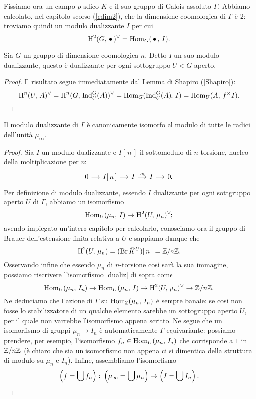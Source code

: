 Fissiamo ora un campo $ p $-adico $ K $ e il suo gruppo di Galois assoluto $ \Gamma $. Abbiamo calcolato, nel capitolo scorso (\ref{cdim2}), che la dimensione coomologica di $ \Gamma $ è 2: troviamo quindi un modulo dualizzante $ I $ per cui 
\[ \operatorname{H}^2(G, \, \bullet \, )^\vee = \operatorname{Hom}_G(\,\bullet\, , \, I). \]




\begin{lemma}
	Sia $ G $ un gruppo di dimensione coomologica $ n $. Detto $ I $ un suo modulo dualizzante, questo è dualizzante per ogni sottogruppo $ U < G $ aperto.
\end{lemma}
\begin{proof}
	Il risultato segue immediatamente dal Lemma di Shapiro (\ref{Shapiro}):
	\[ \operatorname{H}^n(U, \, A)^\vee = \operatorname{H}^n(G, \, \operatorname{Ind}_U^G(A))^\vee = \operatorname{Hom}_G(\operatorname{Ind}_U^G(A), \, I) = \operatorname{Hom}_U(A, \, f^\times I). \qedhere \]
\end{proof}


\begin{proposition}
	Il modulo dualizzante di $ \Gamma $ è canonicamente isomorfo al modulo di tutte le radici dell'unità $ \mu_\infty $.
\end{proposition}
\begin{proof}
	Sia $ I $ un modulo dualizzante e $ I[\, n\, ] $ il sottomodulo di $ n $-torsione, nucleo della moltiplicazione per $ n $:
	\[ \begin{tikzcd}[column sep = small]
	0 \rar & I[\, n \,] \rar & I \rar["\cdot n"] & I \rar & 0.
	\end{tikzcd} \]
	Per definizione di modulo dualizzante, essendo $ I $ dualizzante per ogni sottgruppo aperto $ U $ di $ \Gamma $, abbiamo un isomorfismo
	\begin{equation}\label{dualiz}
	\operatorname{Hom}_U(\mu_n, \, I) \to \operatorname{H}^2(U, \, \mu_n)^\vee;
	\end{equation}
	avendo impiegato un'intero capitolo per calcolarlo, conosciamo ora il gruppo di Brauer dell'estensione finita relativa a $ U $ e sappiamo dunque che $$  \operatorname{H}^2(U, \, \mu_n) = (\operatorname{Br} \bar{K}^U)[\, n\, ] = \mathbb{Z}/n\mathbb{Z}.  $$
	Osservando infine che essendo $ \mu_n $ di $ n $-torsione così sarà la sua immagine, possiamo riscrivere l'isomorfismo \eqref{dualiz} di sopra come
	\[ \operatorname{Hom}_U(\mu_n, \, I_n) \to \operatorname{Hom}_U(\mu_n, \, I) \to \operatorname{H}^2(U, \, \mu_n)^\vee \to \mathbb{Z}/n\mathbb{Z}. \]
	Ne deduciamo che l'azione di $ \Gamma $ su $ \operatorname{Hom}_{\mathbb{Z}}(\mu_n, \, I_n) $ è sempre banale: se così non fosse lo stabilizzatore di un qualche elemento sarebbe un sottogruppo aperto $ U $, per il quale non varrebbe l'isomorfismo appena scritto. Ne segue che un isomorfismo di gruppi $ \mu_n \to I_n $ è automaticamente $ \Gamma $ equivariante: possiamo prendere, per esempio, l'isomorfismo $ f_n \in \operatorname{Hom}_U(\mu_n, \, I_n) $ che corrisponde a $ 1 $ in $ \mathbb{Z}/n\mathbb{Z} $ (è chiaro che sia un isomorfismo non appena ci si dimentica della struttura di modulo su $ \mu_n $ e $ I_n $). Infine, assembliamo l'isomorfismo
	\[ \left(f = \bigcup f_n\right) \colon \left(\mu_\infty = \bigcup \mu_n\right) \to \left(I = \bigcup I_n\right). \qedhere \]
\end{proof}

